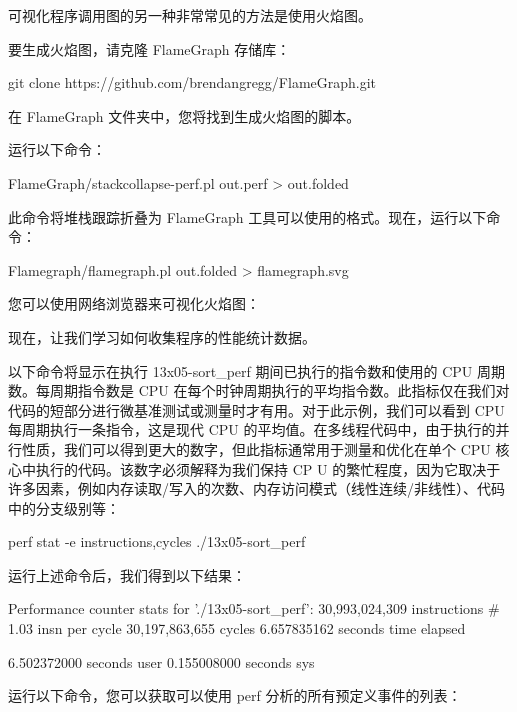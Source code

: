 可视化程序调用图的另一种非常常见的方法是使用火焰图。

要生成火焰图，请克隆 FlameGraph 存储库：

\begin{shell}
git clone https://github.com/brendangregg/FlameGraph.git
\end{shell}

在 FlameGraph 文件夹中，您将找到生成火焰图的脚本。

运行以下命令：

\begin{shell}
FlameGraph/stackcollapse-perf.pl out.perf > out.folded
\end{shell}

此命令将堆栈跟踪折叠为 FlameGraph 工具可以使用的格式。现在，运行以下命令：

\begin{shell}
Flamegraph/flamegraph.pl out.folded > flamegraph.svg
\end{shell}

您可以使用网络浏览器来可视化火焰图：


现在，让我们学习如何收集程序的性能统计数据。

以下命令将显示在执行 13x05-sort\_perf 期间已执行的指令数和使用的 CPU 周期数。每周期指令数是 CPU 在每个时钟周期执行的平均指令数。此指标仅在我们对代码的短部分进行微基准测试或测量时才有用。对于此示例，我们可以看到 CPU 每周期执行一条指令，这是现代 CPU 的平均值。在多线程代码中，由于执行的并行性质，我们可以得到更大的数字，但此指标通常用于测量和优化在单个 CPU 核心中执行的代码。该数字必须解释为我们保持 CP U 的繁忙程度，因为它取决于许多因素，例如内存读取/写入的次数、内存访问模式（线性连续/非线性）、代码中的分支级别等：

\begin{shell}
perf stat -e instructions,cycles ./13x05-sort_perf
\end{shell}

运行上述命令后，我们得到以下结果：

\begin{shell}
Performance counter stats for './13x05-sort_perf':
    30,993,024,309        instructions      #       1.03 insn per cycle
    30,197,863,655        cycles
    6.657835162 seconds time elapsed

    6.502372000 seconds user
    0.155008000 seconds sys
\end{shell}

运行以下命令，您可以获取可以使用 perf 分析的所有预定义事件的列表：

